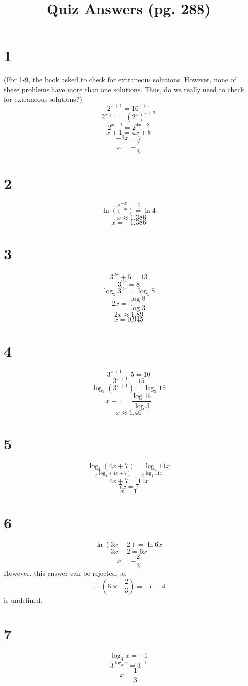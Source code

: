 \documentclass{article}
\title{Quiz Answers (pg. 288)}
\theoremstyle{definition}
\newcommand{\?}{\stackrel{?}{=}}
\begin{document}
\maketitle

\section*{1}
(For 1-9, the book asked to check for extraneous solutions. However, none of these problems have more than one solutions. Thus, do we 
really need to check for extraneous solutions?)\newline
\[ 2^{x+1}=16^{x+2} \] \[ 2^{x+1}=(2^4)^{x+2} \] \[ 2^{x+1}=2^{4x+8} \] \[ x+1=4x+8 \] \[ -3x=7 \] \[ x=-\frac{7}{3} \]

\section*{2}
\[ e^{-x}=4 \] \[ \ln (e^{-x})=\ln 4 \] \[ -x\approx 1.386 \] \[ x=-1.386 \]

\section*{3}
\[ 3^{2x}+5=13 \] \[ 3^{2x}=8 \] \[ \log_3 3^{2x}=\log_3 8 \] \[ 2x=\dfrac{\log 8}{\log 3} \]
\[ 2x\approx 1.89 \] \[ x=0.945 \] 

\section*{4}
\[ 3^{x+1}-5=10 \] \[ 3^{x+1}=15 \] \[ \log_3 \left(3^{x+1}\right)=\log_3 15 \] \[ x+1=\dfrac{\log 15}{\log 3} \]
\[ x\approx 1.46 \]

\section*{5}
\[ \log_4\left( 4x+7\right)=\log_4 11x \] \[ 4^{\log_4\left(4x+7\right)}=4^{\log_4 11x} \]
\[ 4x+7=11x \] \[ 7x=7 \] \[ x=1 \]

\section*{6}
\[ \ln\left(3x-2\right)=\ln 6x \] \[ 3x-2=6x \] \[ x=-\frac{2}{3} \]
However, this answer can be rejected, as \[ \ln\left(6\times-\frac{2}{3}\right)=\ln -4 \] is undefined. 

\section*{7}
\[ \log_3 x=-1 \] \[ 3^{\log_3 x}=3^{-1} \] \[ x=\frac{1}{3} \]
\end{document}
